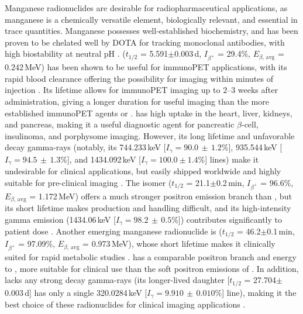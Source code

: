 Manganese radionuclides are desirable for radiopharmaceutical applications, as manganese is a chemically versatile element, biologically relevant, and essential in trace quantities. 
Manganese possesses well-established biochemistry, and has been proven to be chelated well by DOTA for tracking monoclonal antibodies, with high biostability at neutral pH \cite{Graves2015}.
 ($t_{1/2}$ = 5.591$\pm$0.003\,d, $I_{\beta^+}$ = 29.4\%, $E_{\beta\text{, avg}}$ = 0.242\,MeV) has been shown to be useful for immunoPET applications, with its rapid blood clearance offering the possibility for imaging within minutes of injection \cite{Dong2015}.
Its lifetime allows for immunoPET imaging up to 2--3 weeks after administration, giving  a longer duration for useful imaging  than the more established immunoPET agents  or    \cite{Graves2015}. 
  has high uptake in the heart, liver, kidneys, and pancreas, making it a useful diagnostic agent for pancreatic $\beta$-cell, insulinoma, and porphysome imaging. 
However, its  long lifetime and unfavorable decay gamma-rays (notably, its  744.233\,keV [$I_\gamma = 90.0\,\pm\,1.2\%$], 935.544\,keV [$I_\gamma = 94.5\,\pm\,1.3\%$], and 1434.092\,keV [$I_\gamma = 100.0 \pm 1.4\%$] lines) make it undesirable for clinical applications, but easily shipped worldwide and highly suitable for pre-clinical imaging \cite{Dong2015}.
The  isomer ($t_{1/2}$ = 21.1$\pm$0.2\,min, $I_{\beta^+}$ = 96.6\%, $E_{\beta\text{, avg}}$ = 1.172\,MeV) offers a much stronger positron emission branch than , but its short lifetime makes production and handling difficult, and its  high-intensity gamma emission (1434.06\,keV [$I_\gamma = 98.2\,\pm\,0.5\%$]) contributes significantly to patient dose  \cite{Dong2015}.
Another emerging manganese radionuclide is  ($t_{1/2}$ = 46.2$\pm$0.1\,min, $I_{\beta^+}$ = 97.09\%, $E_{\beta\text{, avg}}$ = 0.973\,MeV), whose short lifetime makes it clinically suited for rapid metabolic studies \cite{Wang2017}.
 has a comparable positron branch and energy to , more suitable for clinical use than the soft positron emissions of . 
In addition,  lacks any strong decay gamma-rays (its longer-lived daughter  [$t_{1/2}$ = 27.704$\pm$0.003\,d] has only a single  320.0284\,keV [$I_\gamma = 9.910\,\pm\,0.010\%$] line), making it the best choice of these radionuclides for clinical imaging applications \cite{Wang2017}.








